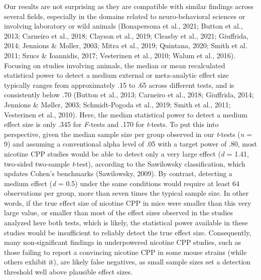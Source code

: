\documentclass[authordate, meta]{jote-new-article}
\begin{document}
	Our results are not surprising as they are compatible with similar findings across several fields, especially in the domains related to neuro-behavioral sciences or involving laboratory or wild animals (Bonapersona et al., 2021; Button et al., 2013; Carneiro et al., 2018; Clayson et al., 2019; Cleasby et al., 2021; Giuffrida, 2014; Jennions \& Moller, 2003; Mitra et al., 2019; Quintana, 2020; Smith et al. 2011; Szucs \& Ioannidis, 2017; Vesterinen et al., 2010; Walum et al., 2016). Focusing on studies involving animals, the median or mean recalculated statistical power to detect a medium external or meta-analytic effect size typically ranges from approximately .15 to .65 across different tests, and is consistently below .70 (Button et al., 2013; Carneiro et al., 2018; Giuffrida, 2014; Jennions \& Møller, 2003; Schmidt-Pogoda et al., 2019; Smith et al., 2011; Vesterinen et al., 2010). Here, the median statistical power to detect a medium effect size is only .345 for \emph{F}-tests and .170 for \emph{t}-tests. To put this into perspective, given the median sample size per group observed in our \emph{t}-tests (\emph{n} = 9) and assuming a conventional alpha level of .05 with a target power of .80, most nicotine CPP studies would be able to detect only a very large effect (\emph{d} = 1.41, two-sided two-sample \emph{t}-test), according to the Sawilowsky classification, which updates Cohen's benchmarks (Sawilowsky, 2009). By contrast, detecting a medium effect (\emph{d} = 0.5) under the same conditions would require at least 64 observations per group, more than seven times the typical sample size. In other words, if the true effect size of nicotine CPP in mice were smaller than this very large value, or smaller than most of the effect sizes observed in the studies analyzed here both tests, which is likely, the statistical power available in these studies would be insufficient to reliably detect the true effect size. Consequently, many non-significant findings in underpowered nicotine CPP studies, such as those failing to report a convincing nicotine CPP in some mouse strains (while others exhibit it), are likely false negatives, as small sample sizes set a detection threshold well above plausible effect sizes.
\end{document}
